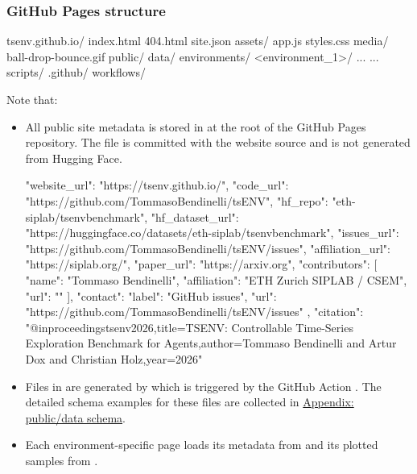 \documentclass[11pt]{article}
\begin{document}
\subsubsection*{GitHub Pages structure}
\begin{LinkedDocCode}
tsenv.github.io/
  index.html
  404.html
  site.json
  assets/
    app.js
    styles.css
    media/
      ball-drop-bounce.gif
  public/
    data/
      \websiteTreeSummaryJson
      \websiteTreeLeaderboardJson
      environments/
        <environment_1>/
          \websiteTreeEnvironmentDescriptionJson
          \websiteTreeEnvironmentDataJson
          ...
      ...
  scripts/
    \websiteTreeGenerateWebsiteData
  .github/
    workflows/
      \websiteTreeDeployWorkflow
\end{LinkedDocCode}
Note that:
\begin{itemize}
  \item  All public site metadata is stored in  at the root of the GitHub Pages repository.
  The file is committed with the website source and is not generated from Hugging Face.
  \begin{DocCode}
  {
    "website_url": "https://tsenv.github.io/",
    "code_url": "https://github.com/TommasoBendinelli/tsENV",
    "hf_repo": "eth-siplab/tsenvbenchmark",
    "hf_dataset_url": "https://huggingface.co/datasets/eth-siplab/tsenvbenchmark",
    "issues_url": "https://github.com/TommasoBendinelli/tsENV/issues",
    "affiliation_url": "https://siplab.org/",
    "paper_url": "https://arxiv.org",
    "contributors": [
      {
        "name": "Tommaso Bendinelli",
        "affiliation": "ETH Zurich SIPLAB / CSEM",
        "url": ""
      }
    ],
    "contact": {
      "label": "GitHub issues",
      "url": "https://github.com/TommasoBendinelli/tsENV/issues"
    },
    "citation": "@inproceedings{tsenv2026,\n  title={TSENV: Controllable Time-Series Exploration Benchmark for Agents},\n  author={Tommaso Bendinelli and Artur Dox and Christian Holz},\n  year={2026}\n}"
  }
  \end{DocCode}

  \item Files in  are generated by  which is triggered by the GitHub Action .
  The detailed schema examples for these files are collected in \hyperref[sec:website-public-data-schema-appendix]{Appendix: public/data schema}.
  \item Each environment-specific page loads its metadata from  and its plotted samples from .
\end{itemize}
\end{document}
